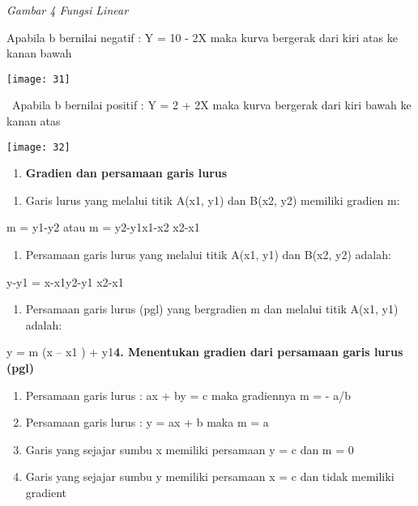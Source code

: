 \documentclass[11pt,fleqn]{book} %
\begin{document}
\noindent 

\noindent 

\noindent \textit{Gambar 4  Fungsi Linear}

\noindent Apabila b bernilai negatif : Y = 10 - 2X maka kurva bergerak dari kiri atas ke kanan bawah

\begin{center}
\noindent \texttt{[image: 31]}
\end{center}

\noindent ~Apabila b bernilai positif : Y = 2 + 2X maka kurva bergerak dari kiri bawah ke kanan atas~~

\begin{center}
\noindent \texttt{[image: 32]}
\end{center}

\begin{enumerate}
\item  \textbf{Gradien dan persamaan garis lurus}
\end{enumerate}

\noindent 

\begin{enumerate}
\item  Garis lurus yang melalui titik A(x1, y1) dan B(x2, y2) memiliki gradien m:
\end{enumerate}

\noindent m = y1-y2 atau m = y2-y1x1-x2 x2-x1

\noindent 

\begin{enumerate}
\item  Persamaan garis lurus yang melalui titik A(x1, y1) dan B(x2, y2) adalah:
\end{enumerate}

\noindent y-y1 = x-x1y2-y1 x2-x1

\begin{enumerate}
\item  Persamaan garis lurus (pgl) yang bergradien m dan melalui titik A(x1, y1) adalah:
\end{enumerate}

y = m (x -- x1 ) + y1\textbf{4.  Menentukan gradien dari persamaan garis lurus (pgl)}

\textbf{}

\begin{enumerate}
\item \textbf{ }Persamaan garis lurus : ax + by = c maka gradiennya m = - a/b

\item  Persamaan garis lurus : y = ax + b maka m = a

\item  Garis yang sejajar sumbu x memiliki persamaan y = c dan m = 0

\item  Garis yang sejajar sumbu y memiliki persamaan x = c dan tidak memiliki gradient
\end{enumerate}
\end{document}
